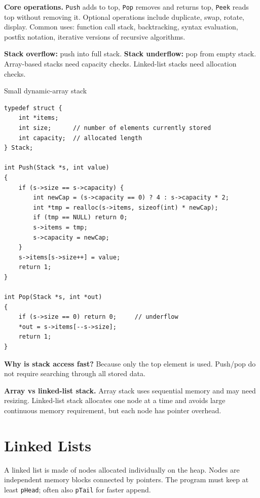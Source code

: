 \documentclass[9pt,a4paper]{article}
\newcommand{\code}[1]{\texttt{#1}}
\begin{document}
\textbf{Core operations.} \code{Push} adds to top, \code{Pop} removes and returns top, \code{Peek} reads top without removing it. Optional operations include duplicate, swap, rotate, display. Common uses: function call stack, backtracking, syntax evaluation, postfix notation, iterative versions of recursive algorithms.

\begin{danger}
\textbf{Stack overflow:} push into full stack. \textbf{Stack underflow:} pop from empty stack. Array-based stacks need capacity checks. Linked-list stacks need allocation checks.
\end{danger}

\begin{codebox}{Small dynamic-array stack}
\begin{lstlisting}[style=cstyle]
typedef struct {
    int *items;
    int size;      // number of elements currently stored
    int capacity;  // allocated length
} Stack;

int Push(Stack *s, int value)
{
    if (s->size == s->capacity) {
        int newCap = (s->capacity == 0) ? 4 : s->capacity * 2;
        int *tmp = realloc(s->items, sizeof(int) * newCap);
        if (tmp == NULL) return 0;
        s->items = tmp;
        s->capacity = newCap;
    }
    s->items[s->size++] = value;
    return 1;
}

int Pop(Stack *s, int *out)
{
    if (s->size == 0) return 0;     // underflow
    *out = s->items[--s->size];
    return 1;
}
\end{lstlisting}
\end{codebox}

\begin{exam}
\textbf{Why is stack access fast?} Because only the top element is used. Push/pop do not require searching through all stored data.\par
\textbf{Array vs linked-list stack.} Array stack uses sequential memory and may need resizing. Linked-list stack allocates one node at a time and avoids large continuous memory requirement, but each node has pointer overhead.
\end{exam}

\section{Linked Lists}
\begin{idea}
A linked list is made of nodes allocated individually on the heap. Nodes are independent memory blocks connected by pointers. The program must keep at least \code{pHead}; often also \code{pTail} for faster append.
\end{idea}
\end{document}
